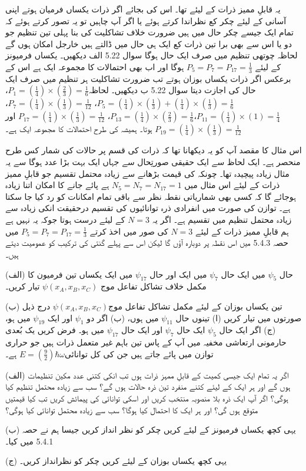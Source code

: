 یہ قابلِ ممیز ذرات کے لیئے تھا۔ اس کی بجائے اگر ذرات یکساں فرمیان ہوتے اپنی آسانی کے لیئے چکر کع نظراندا کرتے ہوئے یا اگر آپ چاہیں تو یہ تصور کرتے ہوئے کہ تمام ایک جیسے چکر حال میں ہیں ضرورت خلاف تشاکلیت کی بنا پہلی تین تنظیم جو دو یا اس سے بھی برا تین ذرات کع ایک ہی حال میں ڈالتے ہیں خارجل امکان ہوں گے لحاظہ چوتھی تنظیم میں صرف ایک حال ہوگا سوال \num{5.22} الف دیکھیں۔ یکساں فرمیونز کے لیئے \(P_5 = P_7 = P_{17} = \frac{1}{3}\) ہوگا اور اب بھی احتمالات کا مجموعہ ایک ہے اس کے برعکس اگر ذرات یکساں بوزان ہوتے تب ضرورت تشاکلیت ہر تنظیم میں صرف ایک حال کی اجازت دیتا سوال \num{5.22} ب دیکھیں۔ لحاظہ\(P_1 = (\frac{1}{4})\times(\frac{2}{3}) = \frac{1}{6}\)، \(P_5 = (\frac{1}{4})\times(\frac{1}{3}) + (\frac{1}{4})\times(\frac{1}{3}) = \frac{1}{6}\)، \(P_7 = (\frac{1}{4})\times(\frac{1}{3}) = \frac{1}{12}\)، \(P_{11} = (\frac{1}{4})\times(1) = \frac{1}{4}\)،\(P_{13} = (\frac{1}{4})\times(\frac{2}{3}) = \frac{1}{6}\)، \(P_{17} = (\frac{1}{4})\times(\frac{1}{3}) = \frac{1}{12}\) اور \(P_{19} = (\frac{1}{4})\times(\frac{1}{3}) = \frac{1}{12}\) ہوتا۔ ہمیشہ کی طرح احتمالات کا مجموعہ ایک ہے۔

اس مثال کا مقصد آپ کو یہ دیکھانا تھا کہ ذرات کی قسم پر حالات کی شمار کس طرح منحصر ہے۔ ایک لحاظ سے ایک حقیقی صورتِحال سے جہاں  ایک بہت بڑا عدد ہوگا سے یہ مثال زیادہ پیچیدہ تھا۔ چونکہ  کی قیمت بڑھانے سے زیادہ محتمل تقسیم جو قابلِ ممیز ذرات کے لیئے اس مثال میں \(N_5 = N_7 = N_{17} = 1\) ہے پائے جانے کا امکان اتنا زیادہ ہوجائے گا کہ کسی بھی شماریاتی نقطہ نظر سے باقی تمام امکانات کو رد کیا جا سکتا ہے۔ توازن کی صورت میں انفرادی ذرہ توانائیوں کی تقسیم درحقیقت انکی زیادہ سے زیادہ محتمل تنظیم میں تقسیم ہے۔ اگر یہ \(N = 3\)  کے لیئے درست ہوتا جوکہ یہ نہیں ہے ہم قابلِ ممیز ذرات کے لیئے \(N = 3\) کی صور میں اخذ کرتے \(P_5 = P_7 = P_{17} = \frac{1}{3}\) میں حصہ 5.4.3 میں اس نقطہ پر دوبارہ آؤں گا لیکن اس سے پہلے گنتی کی ترکیب کو عمومیت دیتے ہیں۔


(الف) حال \(\psi_5\) میں ایک حال \(\psi_7\) میں ایک اور حال \(\psi_{17}\) میں ایک یکساں تین فرمیون کا مکمل خلاف تشاکل تفاعل موج \(\psi(x_A, x_B, x_C)\) تیار کریں۔

(ب) تین یکساں بوزان کے لیئے مکمل تشاکل تفاعل موج\(\psi(x_A, x_B, x_C)\) درج ذیل صورتوں میں تیار کریں (ا) تینوں حال \(\psi_{11}\) میں ہوں، (ب) اگر دو \(\psi_1\) اور ایک \(\psi_{19}\) میں ہو، (ج) اگر ایک حال \(\psi_5\) ایک حال \(\psi_7\) اور ایک حال \(\psi_{17}\) میں ہو۔ 
فرض کریں یک بُعدی حارمونی ارتعاشی مخفیہ میں آپ کے پاس تین باہم غیر متعمل ذرات ہیں جو حراری توازن میں پائے جاتے ہیں جن کی کل توانائی\(E = (\frac{9}{2})\hbar\omega\) ہے۔

(الف) اگر یہ تمام ایک جیسی کمیت کے قابلِ ممہز ذرات ہوں تب انکی کتنی عدد مکین تنظیمات ہوں گے اور ہر ایک کے لیئے کتنے منفرد تین ذرہ حالات ہوں گے؟ سب سے زیادہ محتمل تنظیم کیا ہوگی؟ اگر آپ ایک ذرہ بلا منصوبہ منتخب کریں اور اسکی توانائی کی پیمائش کریں تب کیا قیمتیں متوقع ہوں گی؟ اور ہر ایک کا احتمال کیا ہوگا؟ سب سے زیادہ محتمل توانائی کیا ہوگی؟

(ب) یہی کچھ یکساں فرمیونز کے لیئے کریں چکر کو نظر انداز کریں جیسا ہم نے حصہ 5.4.1 میں کیا۔

(ج) یہی کچھ یکساں بوزان کے لیئے کریں چکر کو نظرانداز کریں۔ 
